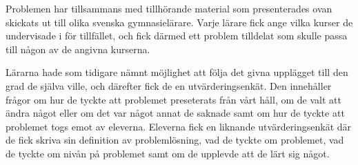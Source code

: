 \textcolor{lila}{Problemen har tillsammans med tillhörande material som presenterades ovan skickats ut till olika svenska gymnasielärare. Varje lärare fick ange vilka kurser de undervisade i för tillfället, och fick därmed ett problem tilldelat som skulle passa till någon av de angivna kurserna.}

\textcolor{lila}{Lärarna hade som tidigare nämnt möjlighet att följa det givna upplägget till den grad de själva ville, och därefter fick de en utvärderingsenkät. Den innehåller frågor om hur de tyckte att problemet preseterats från vårt håll, om de valt att ändra något eller om det var något annat de saknade samt om hur de tyckte att problemet togs emot av eleverna. Eleverna fick en liknande utvärderingsenkät där de fick skriva sin definition av problemlösning, vad de tyckte om problemet, vad de tyckte om nivån på problemet samt om de upplevde att de lärt sig något.}
